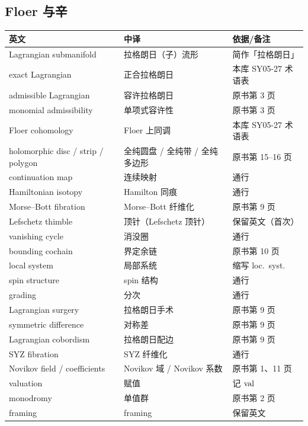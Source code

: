 \subsection*{Floer 与辛}
\begin{longtable}{p{}p{}p{}}
\toprule
英文 & 中译 & 依据/备注\\
\midrule
\endhead
Lagrangian submanifold & 拉格朗日（子）流形 & 简作「拉格朗日」\\
exact Lagrangian & 正合拉格朗日 & 本库 SY05-27 术语表\\
admissible Lagrangian & 容许拉格朗日 & 原书第 3 页\\
monomial admissibility & 单项式容许性 & 原书第 3 页\\
Floer cohomology & Floer 上同调 & 本库 SY05-27 术语表\\
holomorphic disc / strip / polygon & 全纯圆盘 / 全纯带 / 全纯多边形 & 原书第 15--16 页\\
continuation map & 连续映射 & 通行\\
Hamiltonian isotopy & Hamilton 同痕 & 通行\\
Morse--Bott fibration & Morse--Bott 纤维化 & 原书第 9 页\\
Lefschetz thimble & 顶针（Lefschetz 顶针） & 保留英文（首次）\\
vanishing cycle & 消没圈 & 通行\\
bounding cochain & 界定余链 & 原书第 10 页\\
local system & 局部系统 & 缩写 loc.\ syst.\\
spin structure & spin 结构 & 通行\\
grading & 分次 & 通行\\
Lagrangian surgery & 拉格朗日手术 & 原书第 9 页\\
symmetric difference & 对称差 & 原书第 9 页\\
Lagrangian cobordism & 拉格朗日配边 & 原书第 9 页\\
SYZ fibration & SYZ 纤维化 & 通行\\
Novikov field / coefficients & Novikov 域 / Novikov 系数 & 原书第 1、11 页\\
valuation & 赋值 & 记 $\operatorname{val}$\\
monodromy & 单值群 & 原书第 2 页\\
framing & framing & 保留英文\\
\bottomrule
\end{longtable}

